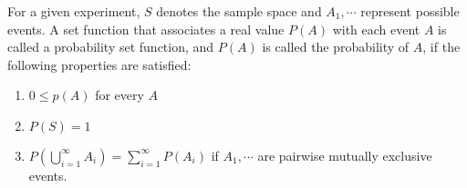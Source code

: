 \begin{defn}
	For a given experiment, $S$ denotes the sample space and $A_1,\cdots$ represent possible events. A set function that associates a real value $P(A)$ with each event $A$ is called a probability set function, and $P(A)$ is called the probability of $A$, if the following properties are satisfied:
	
	\begin{enumerate}[wide, label = $\roman*)$]
		\item $0 \leq p(A)$ for every $A$
		\item $P(S) = 1$
		\item $P(\bigcup_{i=1}^{\infty} A_i) = \sum^{\infty}_{i = 1}P(A_i)$ if $A_1,\cdots$ are pairwise mutually exclusive events.
	\end{enumerate}
\end{defn}



%	
%	

%	
%
%	


